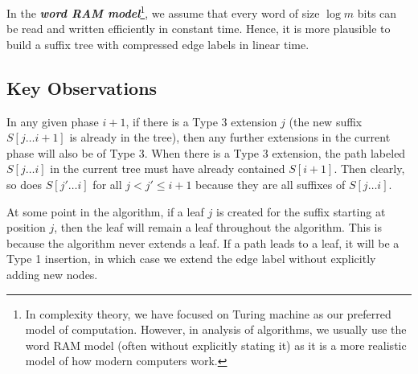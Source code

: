 In the \textit{\textbf{word RAM model}}\footnote{In complexity theory, we have focused on Turing machine as our preferred model of computation. However, in analysis of algorithms, we usually use the word RAM model (often without explicitly stating it) as it is a more realistic model of how modern computers work.}, we assume that every word of size $\log m$ bits can be read and written efficiently in constant time. Hence, it is more plausible to build a suffix tree with compressed edge labels in linear time.

\subsection{Key Observations}


In any given phase $i+1$, if there is a Type 3 extension $j$ (the new suffix $S[j\ldots i+1]$ is already in the tree), then any further extensions in the current phase will also be of Type 3. When there is a Type 3 extension, the path labeled $S[j\ldots i]$ in the current tree must have already contained $S[i+1]$. Then clearly, so does $S[j'\ldots i]$ for all $j < j' \leq i+1$ because they are all suffixes of $S[j\ldots i]$.


At some point in the algorithm, if a leaf $j$ is created for the suffix starting at position $j$, then the leaf will remain a leaf throughout the algorithm. This is because the algorithm never extends a leaf. If a path leads to a leaf, it will be a Type 1 insertion, in which case we extend the edge label without explicitly adding new nodes.